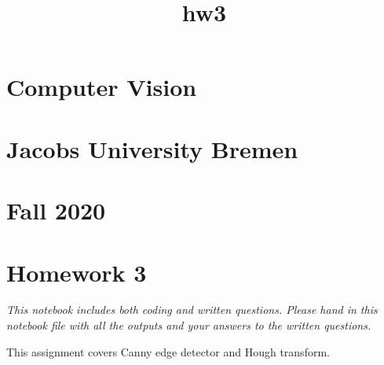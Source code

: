 \documentclass[11pt]{article}
\title{hw3}
\begin{document}
    
    
    \maketitle
    
    

    
    \section{Computer Vision}\label{computer-vision}

\section{Jacobs University Bremen}\label{jacobs-university-bremen}

\section{Fall 2020}\label{fall-2020}

\section{Homework 3}\label{homework-3}

\emph{This notebook includes both coding and written questions. Please
hand in this notebook file with all the outputs and your answers to the
written questions.}

This assignment covers Canny edge detector and Hough transform.
\end{document}
